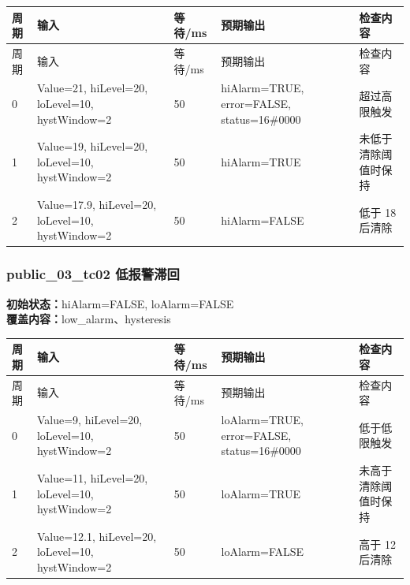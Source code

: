 \begin{longtable}{L{1.0cm}L{4.7cm}L{1.4cm}L{4.0cm}L{2.1cm}}

\toprule

周期 & 输入 & 等待/ms & 预期输出 & 检查内容\\

\midrule

\endfirsthead

\toprule

周期 & 输入 & 等待/ms & 预期输出 & 检查内容\\

\midrule

\endhead

0 & Value=21, hiLevel=20, loLevel=10, hystWindow=2 & 50 & hiAlarm=TRUE, error=FALSE, status=16\#0000 & 超过高限触发\\

1 & Value=19, hiLevel=20, loLevel=10, hystWindow=2 & 50 & hiAlarm=TRUE & 未低于清除阈值时保持\\

2 & Value=17.9, hiLevel=20, loLevel=10, hystWindow=2 & 50 & hiAlarm=FALSE & 低于 18 后清除\\

\bottomrule

\end{longtable}

\subsubsection{{\ttfamily public\_03\_tc02} 低报警滞回}

\noindent\textbf{初始状态：}hiAlarm=FALSE, loAlarm=FALSE\\

\textbf{覆盖内容：}low\_alarm、hysteresis

\begin{longtable}{L{1.0cm}L{4.7cm}L{1.4cm}L{4.0cm}L{2.1cm}}

\toprule

周期 & 输入 & 等待/ms & 预期输出 & 检查内容\\

\midrule

\endfirsthead

\toprule

周期 & 输入 & 等待/ms & 预期输出 & 检查内容\\

\midrule

\endhead

0 & Value=9, hiLevel=20, loLevel=10, hystWindow=2 & 50 & loAlarm=TRUE, error=FALSE, status=16\#0000 & 低于低限触发\\

1 & Value=11, hiLevel=20, loLevel=10, hystWindow=2 & 50 & loAlarm=TRUE & 未高于清除阈值时保持\\

2 & Value=12.1, hiLevel=20, loLevel=10, hystWindow=2 & 50 & loAlarm=FALSE & 高于 12 后清除\\

\bottomrule

\end{longtable}

